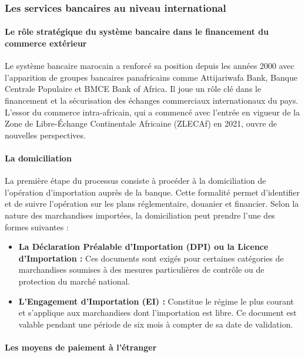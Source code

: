 \documentclass[12pt,a4paper]{report}
\begin{document}
\subsubsection*{Les services bancaires au niveau international}

\paragraph{Le rôle stratégique du système bancaire dans le financement du commerce extérieur}

Le système bancaire marocain a renforcé sa position depuis les années 2000 avec l'apparition de groupes bancaires panafricains comme Attijariwafa Bank, Banque Centrale Populaire et BMCE Bank of Africa. Il joue un rôle clé dans le financement et la sécurisation des échanges commerciaux internationaux du pays. L'essor du commerce intra-africain, qui a commencé avec l'entrée en vigueur de la Zone de Libre-Échange Continentale Africaine (ZLECAf) en 2021, ouvre de nouvelles perspectives.

\paragraph{La domiciliation}

La première étape du processus consiste à procéder à la domiciliation de l'opération d'importation auprès de la banque. Cette formalité permet d'identifier et de suivre l'opération sur les plans réglementaire, douanier et financier. Selon la nature des marchandises importées, la domiciliation peut prendre l'une des formes suivantes :

\begin{itemize}
  \item \textbf{La Déclaration Préalable d'Importation (DPI) ou la Licence d'Importation :} Ces documents sont exigés pour certaines catégories de marchandises soumises à des mesures particulières de contrôle ou de protection du marché national.

  \item \textbf{L'Engagement d'Importation (EI) :} Constitue le régime le plus courant et s'applique aux marchandises dont l'importation est libre. Ce document est valable pendant une période de six mois à compter de sa date de validation.
\end{itemize}

\paragraph{Les moyens de paiement à l'étranger}
\end{document}
